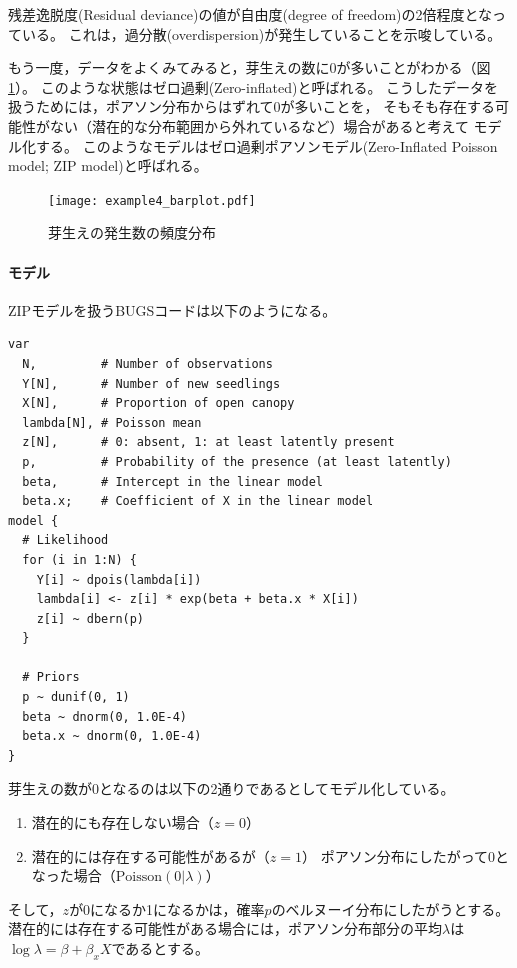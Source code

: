 \documentclass[11pt,uplatex]{jsarticle}
\begin{document}
残差逸脱度(Residual deviance)の値が自由度(degree of freedom)の2倍程度となっている。
これは，過分散(overdispersion)が発生していることを示唆している。

もう一度，データをよくみてみると，芽生えの数に0が多いことがわかる（図\ref{example4_barplot}）。
このような状態はゼロ過剰(Zero-inflated)と呼ばれる。
こうしたデータを扱うためには，ポアソン分布からはずれて0が多いことを，
そもそも存在する可能性がない（潜在的な分布範囲から外れているなど）場合があると考えて
モデル化する。
このようなモデルはゼロ過剰ポアソンモデル(Zero-Inflated Poisson model; ZIP model)と呼ばれる。

\begin{figure}[hbtp]
  \begin{center}
    \texttt{[image: example4\_barplot.pdf]}
  \end{center}
  \caption{芽生えの発生数の頻度分布}
  \label{example4_barplot}
\end{figure}

\paragraph{モデル}
ZIPモデルを扱うBUGSコードは以下のようになる。

\begin{lstlisting}
var
  N,         # Number of observations
  Y[N],      # Number of new seedlings
  X[N],      # Proportion of open canopy
  lambda[N], # Poisson mean
  z[N],      # 0: absent, 1: at least latently present
  p,         # Probability of the presence (at least latently)
  beta,      # Intercept in the linear model
  beta.x;    # Coefficient of X in the linear model
model {
  # Likelihood
  for (i in 1:N) {
    Y[i] ~ dpois(lambda[i])
    lambda[i] <- z[i] * exp(beta + beta.x * X[i])
    z[i] ~ dbern(p)
  }

  # Priors
  p ~ dunif(0, 1)
  beta ~ dnorm(0, 1.0E-4)
  beta.x ~ dnorm(0, 1.0E-4)
}
\end{lstlisting}


芽生えの数が0となるのは以下の2通りであるとしてモデル化している。
\begin{enumerate}
\item 潜在的にも存在しない場合（$z=0$）
\item 潜在的には存在する可能性があるが（$z=1$）
ポアソン分布にしたがって0となった場合（$\mathrm{Poisson}(0|\lambda)$）
\end{enumerate}
そして，$z$が0になるか1になるかは，確率$p$のベルヌーイ分布にしたがうとする。
潜在的には存在する可能性がある場合には，ポアソン分布部分の平均$\lambda$は
$\log\lambda = \beta + \beta_{x}X$であるとする。
\end{document}
